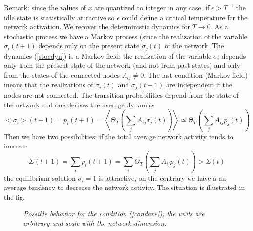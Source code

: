 Remark: since the values of $x$ are
quantized to integer in any case, if $\epsilon>T^{-1}$ the idle state is statistically attractive so $\epsilon$ could define a critical temperature
for the network activation. We recover the deterministic dynamics for $T\to 0$. As a stochastic process we have a Markov process (since
the realization of the variable $\sigma_i(t+1)$ depends only on the present state $\sigma_j(t)$ of the network. The dynamics (\ref{stocdyn})
is a Markov field: the realization of the variable $\sigma_i$ depends only from the present state of the network (and not from past states) and
only from the states of the connected nodes $A_{ij}\ne 0$. The last condition (Markov field) means that the realizations of $\sigma_i(t)$
and $\sigma_j(t-1)$ are independent if the nodes are not connected. The transition probabilities depend from the state of the network
and one derives the average dynamics
\begin{equation}
<\sigma_i>(t+1)=p_i(t+1)=\left \langle \Theta_T\left (\sum_j A_{ij}\sigma_j(t)\right ) \right \rangle\simeq
 \Theta_T\left (\sum_j A_{ij}p_j(t)\right ) 
\label{avestoc}
\end{equation}
Then we have two possibilities: if the total average network activity tends to increase
\begin{equation}
\bar \Sigma(t+1)=\sum_i p_i(t+1) =\sum_i  \Theta_T\left (\sum_j A_{ij}p_j(t)\right ) > \bar \Sigma(t)
\label{condave}
\end{equation}
the equilibrium solution $\sigma_i=1$ is attractive, on the contrary we have a an average tendency to decrease the network activity. 
The situation is illustrated in the fig. \label{fig:crit}
\begin{figure}[h]
\label{fig:crit} 
\caption{\emph{Possible behavior for the condition (\ref{condave}); the units are arbitrary and scale with the network dimension.}}
\end{figure}
